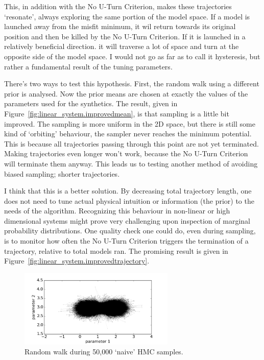 This, in addition with the No U-Turn Criterion, makes these trajectories `resonate', always exploring the same portion of the model space. If a model is launched away from the misfit minimum, it wil return towards its original position and then be killed by the No U-Turn Criterion. If it is launched in a relatively beneficial direction. it will traverse a lot of space and turn at the opposite side of the model space. I would not go as far as to call it hysteresis, but rather a fundamental result of the tuning parameters.

There's two ways to test this hypothesis. First, the random walk using a different prior is analysed. Now the prior means are chosen at exactly the values of the parameters used for the synthetics. The result, given in Figure~\ref{fig:linear_system.improvedmean}, is that sampling is a little bit improved. The sampling is more uniform in the 2D space, but there is still some kind of `orbiting' behaviour, the sampler never reaches the minimum potential. This is because all trajectories passing through this point are not yet terminated. Making trajectories even longer won't work, because the No U-Turn Criterion will terminate them anyway. This leads us to testing another method of avoiding biased sampling; shorter trajectories.

I think that this is a better solution. By decreasing total trajectory length, one does not need to tune actual physical intuition or information (the prior) to the needs of the algorithm. Recognizing this behaviour in non-linear or high dimensional systems might prove very challenging upon inspection of marginal probability distributions. One quality check one could do, even during sampling, is to monitor how often the No U-Turn Criterion triggers the termination of a trajectory, relative to total models ran. The promising result is given in Figure~\ref{fig:linear_system.improvedtrajectory}.

\begin{figure}
	\centering
	\includegraphics[width=0.66\textwidth]{simple-linear-system/figures/2d_naive/randomWalk_50000.png}
	\caption{Random walk during 50,000 `naive' \gls{HMC} samples.}
	\label{fig:linear_system.randomWalk50000naive}
\end{figure}

